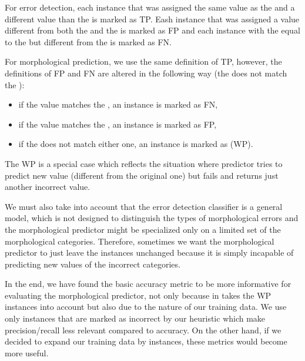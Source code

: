 
For error detection, each instance that was assigned the same value as the 
and a different value than the  is marked as TP. Eash instance
that was assigned a value different from both the  and the 
is marked as FP and each instance with the  equal to the 
but different from the  is marked as FN.

For morphological prediction, we use the same definition of TP, however, the definitions
of FP and FN are altered in the following way (the 
does not match the ):
\begin{itemize}
\item if the  value matches the , an instance is marked as FN,
\item if the  value matches the , an instance is marked as FP,
\item if the  does not match either one, an instance is marked as  (WP).
\end{itemize}

The WP is a special case which reflects the situation where predictor tries to predict new value (different
from the original one) but fails and returns just another incorrect value.

We must also take into account
that the error detection classifier is a general model, which is not designed to distinguish
the types of morphological errors and the morphological predictor might be specialized only on a limited
set of the morphological categories. Therefore, sometimes we want the morphological predictor to just leave the 
instances unchanged because it is simply incapable of predicting new values of the incorrect categories.

In the end, we have found the basic accuracy metric to be more informative for evaluating the morphological predictor,
not only because in takes the WP instances into account but also due to the nature of our training data. We use only instances
that are marked as incorrect by our heuristic
which make precision/recall less relevant compared to accuracy.
On the other hand, if we decided to expand our training data
by  instances, these metrics would become more useful. 

